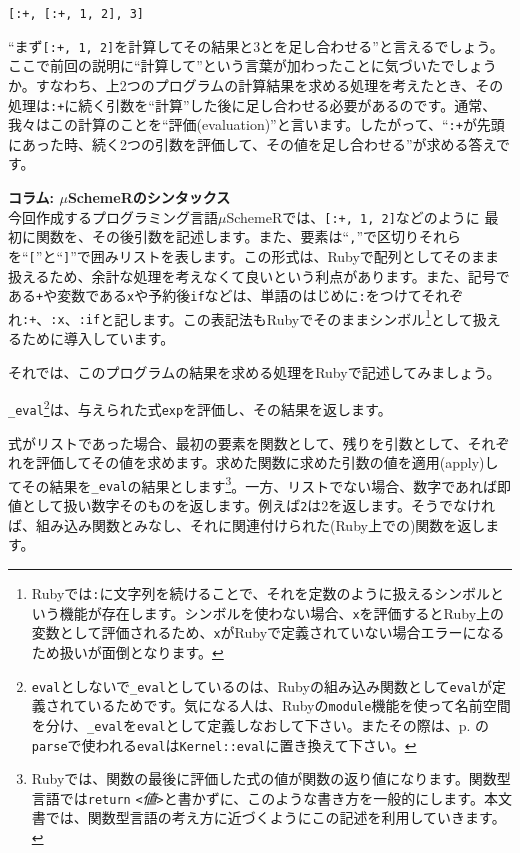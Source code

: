 \begin{lstlisting}
[:+, [:+, 1, 2], 3]
\end{lstlisting}

“まず{\tt [:+, 1, 2]}を計算してその結果と3とを足し合わせる”と言えるでしょう。ここで前回の説明に“計算して”という言葉が加わったことに気づいたでしょうか。すなわち、上2つのプログラムの計算結果を求める処理を考えたとき、その処理は{\tt :+}に続く引数を“計算”した後に足し合わせる必要があるのです。通常、我々はこの計算のことを“評価(evaluation)”と言います。したがって、“{\tt :+}が先頭にあった時、続く2つの引数を評価して、その値を足し合わせる”が求める答えです。

\begin{boxnote}
{\bf コラム: $\mu$SchemeRのシンタックス} \\

今回作成するプログラミング言語$\mu$SchemeRでは、{\tt [:+, 1, 2]}などのように
最初に関数を、その後引数を記述します。また、要素は“{\tt ,}”で区切りそれらを“{\tt [}”と“{\tt ]}”で囲みリストを表します。この形式は、Rubyで配列としてそのまま扱えるため、余計な処理を考えなくて良いという利点があります。また、記号である{\tt +}や変数である{\tt x}や予約後{\tt if}などは、単語のはじめに{\tt :}をつけてそれぞれ{\tt :+}、{\tt :x}、{\tt :if}と記します。この表記法もRubyでそのままシンボル\footnote{Rubyでは{\tt :}に文字列を続けることで、それを定数のように扱えるシンボルという機能が存在します。シンボルを使わない場合、{\tt x}を評価するとRuby上の変数として評価されるため、{\tt x}がRubyで定義されていない場合エラーになるため扱いが面倒となります。}として扱えるために導入しています。
\end{boxnote}

それでは、このプログラムの結果を求める処理をRubyで記述してみましょう。

{\tt \_eval}\footnote{{\tt eval}としないで{\tt \_eval}としているのは、Rubyの組み込み関数として{\tt eval}が定義されているためです。気になる人は、Rubyの{\tt module}機能を使って名前空間を分け、{\tt \_eval}を{\tt eval}として定義しなおして下さい。またその際は、p. \pageref{fun:parse}の{\tt parse}で使われる{\tt eval}は{\tt Kernel::eval}に置き換えて下さい。}は、与えられた式{\tt exp}を評価し、その結果を返します。

式がリストであった場合、最初の要素を関数として、残りを引数として、それぞれを評価してその値を求めます。求めた関数に求めた引数の値を適用(apply)してその結果を{\tt \_eval}の結果とします\footnote{Rubyでは、関数の最後に評価した式の値が関数の返り値になります。関数型言語では{\tt return} {\it {\tt <}値{\tt >}}と書かずに、このような書き方を一般的にします。本文書では、関数型言語の考え方に近づくようにこの記述を利用していきます。}。一方、リストでない場合、数字であれば即値として扱い数字そのものを返します。例えば{\tt 2}は2を返します。そうでなければ、組み込み関数とみなし、それに関連付けられた(Ruby上での)関数を返します。

